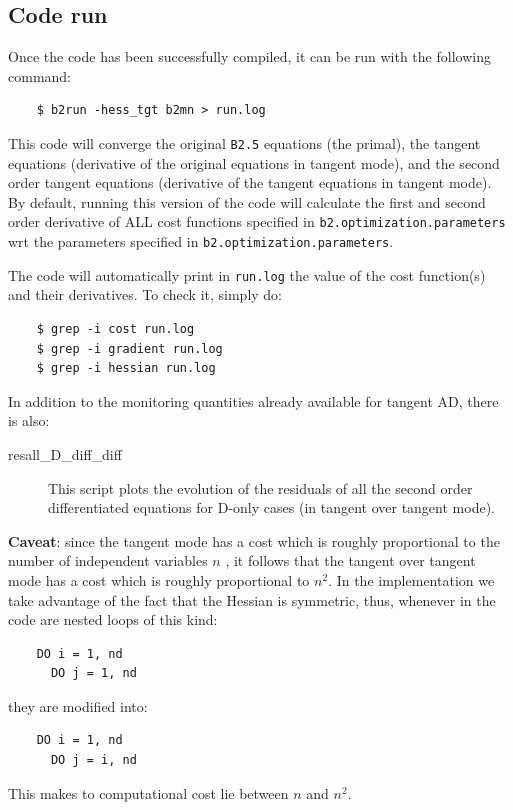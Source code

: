 \subsection{Code run}

Once the code has been successfully compiled, it can be run with the following command:
\begin{verbatim}
	$ b2run -hess_tgt b2mn > run.log
\end{verbatim}

This code will converge the original {\tt B2.5} equations (the primal), the tangent equations (derivative of the original equations in tangent mode), and the second order tangent equations (derivative of the tangent equations in tangent mode). By default, running this version of the code will calculate the first and second order derivative of ALL cost functions specified in {\tt b2.optimization.parameters} wrt the parameters specified in {\tt b2.optimization.parameters}.

The code will automatically print in {\tt run.log} the value of the cost function(s) and their derivatives. To check it, simply do:
\begin{verbatim}
	$ grep -i cost run.log
	$ grep -i gradient run.log
	$ grep -i hessian run.log
\end{verbatim}

In addition to the monitoring quantities already available for tangent AD, there is also:
\begin{description}
	\item[resall\_D\_diff\_diff] This script plots the evolution of the residuals of all the second order differentiated equations for D-only cases (in tangent over tangent mode).
\end{description}

\textbf{Caveat}: since the tangent mode has a cost which is roughly proportional to the number of independent variables $n$ \cite{carlijcp}, it follows that the tangent over tangent mode has a cost which is roughly proportional to $n^2$. In the \SOLPSITER implementation we take advantage of the fact that the Hessian is symmetric, thus, whenever in the code are nested loops of this kind:
\begin{verbatim}
	DO i = 1, nd
	  DO j = 1, nd 
\end{verbatim}
they are modified into:
\begin{verbatim}
	DO i = 1, nd
	  DO j = i, nd 
\end{verbatim}
This makes to computational cost lie between $n$ and $n^2$.
